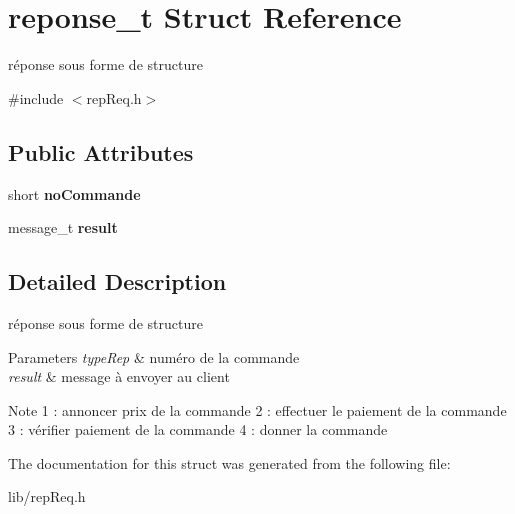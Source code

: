 \hypertarget{structreponse__t}{}\section{reponse\+\_\+t Struct Reference}
\label{structreponse__t}


réponse sous forme de structure  




{\ttfamily \#include $<$rep\+Req.\+h$>$}

\subsection*{Public Attributes}
\begin{DoxyCompactItemize}
\item 
\mbox{\label{structreponse__t_a8bf0da408e7953082024cdbf8c62aa4c}} 
short {\bfseries no\+Commande}
\item 
\mbox{\label{structreponse__t_a7de0f301c32849f616a5737601e53409}} 
message\+\_\+t {\bfseries result}
\end{DoxyCompactItemize}


\subsection{Detailed Description}
réponse sous forme de structure 


\begin{DoxyParams}{Parameters}
{\em type\+Rep} & numéro de la commande \\
\hline
{\em result} & message à envoyer au client \\
\hline
\end{DoxyParams}
\begin{DoxyNote}{Note}
1 \+: annoncer prix de la commande 2 \+: effectuer le paiement de la commande 3 \+: vérifier paiement de la commande 4 \+: donner la commande 
\end{DoxyNote}


The documentation for this struct was generated from the following file\+:\begin{DoxyCompactItemize}
\item 
lib/rep\+Req.\+h\end{DoxyCompactItemize}
